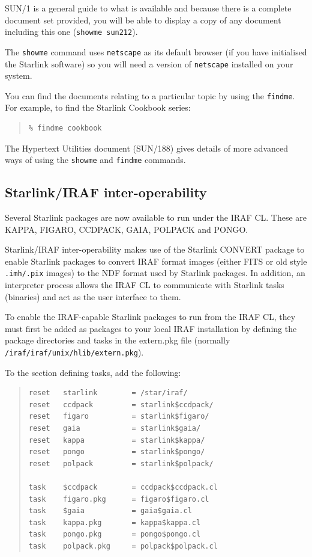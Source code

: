\documentclass[twoside,11pt]{article}
\newcommand{\xref}[3]{#1}
\newcommand{\xlabel}[1]{}
\renewcommand{\_}{\texttt{\symbol{95}}}
\begin{document}
SUN/1 is a general guide to what is available and because there is a
complete document set provided, you will be able to display a copy of any
document including this one (\texttt{showme sun212}).

The \texttt{showme} command uses \texttt{netscape} as its default browser
(if you have initialised the Starlink software) so you will need a version
of \texttt{netscape} installed on your system.

You can find the documents relating to a particular topic by using the
\texttt{findme}. For example, to find the Starlink Cookbook series:

\begin{quote}
\begin{verbatim}
% findme cookbook
\end{verbatim}
\end{quote}

The \xref{Hypertext Utilities}{sun188}{} document (SUN/188) gives details
of more advanced ways of using the \texttt{showme} and \texttt{findme}
commands.

\subsection{\xlabel{starlink_iraf_inter-operability}Starlink/IRAF inter-operability}
\label{starlink_iraf_inter-operability}

Several Starlink packages are now available to run under the IRAF CL\@.  These
are  KAPPA, FIGARO, CCDPACK, GAIA, POLPACK and PONGO.

Starlink/IRAF inter-operability makes use of the Starlink CONVERT
package to enable Starlink packages to convert IRAF format images
(either FITS or old style \texttt{.imh/.pix} images) to the NDF format
used by Starlink packages.  In addition, an interpreter process allows
the IRAF CL to communicate with Starlink tasks (binaries) and act as
the user interface to them.

To enable the IRAF-capable Starlink packages to run from the IRAF CL,
they must first be added as packages to your local IRAF installation by
defining the package directories and tasks in the extern.pkg file
(normally \texttt{/iraf/iraf/unix/hlib/extern.pkg}).

To the section defining tasks, add the following:

\begin{quote}
\begin{verbatim}
reset   starlink        = /star/iraf/
reset   ccdpack         = starlink$ccdpack/
reset   figaro          = starlink$figaro/
reset   gaia            = starlink$gaia/
reset   kappa           = starlink$kappa/
reset   pongo           = starlink$pongo/
reset   polpack         = starlink$polpack/

task    $ccdpack        = ccdpack$ccdpack.cl
task    figaro.pkg      = figaro$figaro.cl
task    $gaia           = gaia$gaia.cl
task    kappa.pkg       = kappa$kappa.cl
task    pongo.pkg       = pongo$pongo.cl
task    polpack.pkg     = polpack$polpack.cl
\end{verbatim}
\end{quote}
\end{document}
